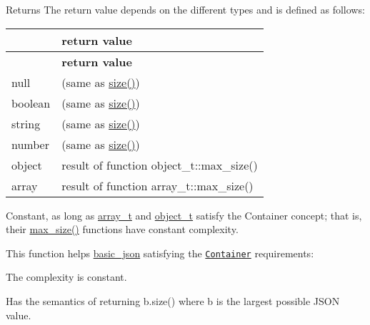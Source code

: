 \begin{DoxyReturn}{Returns}
The return value depends on the different types and is defined as follows\+: \tabulinesep=1mm
\begin{longtabu} spread 0pt [c]{*2{|X[-1]}|}
\hline
{}&{\bf return value  }\\
\endfirsthead
\hline
\endfoot
\hline
{}&{\bf return value  }\\
\endhead
null &{} (same as {\ttfamily \hyperlink{classnlohmann_1_1basic__json_a25e27ad0c6d53c01871c5485e1f75b96}{size()}}) \\
boolean &{} (same as {\ttfamily \hyperlink{classnlohmann_1_1basic__json_a25e27ad0c6d53c01871c5485e1f75b96}{size()}}) \\
string &{} (same as {\ttfamily \hyperlink{classnlohmann_1_1basic__json_a25e27ad0c6d53c01871c5485e1f75b96}{size()}}) \\
number &{} (same as {\ttfamily \hyperlink{classnlohmann_1_1basic__json_a25e27ad0c6d53c01871c5485e1f75b96}{size()}}) \\
object &result of function {\ttfamily object\+\_\+t\+::max\+\_\+size()} \\
array &result of function {\ttfamily array\+\_\+t\+::max\+\_\+size()} \\
\end{longtabu}
Constant, as long as \hyperlink{classnlohmann_1_1basic__json_a4c409f1b6d9caf3412c78af9a5883fed}{array\+\_\+t} and \hyperlink{classnlohmann_1_1basic__json_a3cdea044cc3ecba1c4f9874a89daf6e4}{object\+\_\+t} satisfy the Container concept; that is, their {\ttfamily \hyperlink{classnlohmann_1_1basic__json_a2f47d3c6a441c57dd2be00449fbb88e1}{max\+\_\+size()}} functions have constant complexity.
\end{DoxyReturn}
This function helps {\ttfamily \hyperlink{classnlohmann_1_1basic__json}{basic\+\_\+json}} satisfying the \href{http://en.cppreference.com/w/cpp/concept/Container}{\tt Container} requirements\+:
\begin{DoxyItemize}
\item The complexity is constant.
\item Has the semantics of returning {\ttfamily b.\+size()} where {\ttfamily b} is the largest possible J\+S\+ON value.
\end{DoxyItemize}

